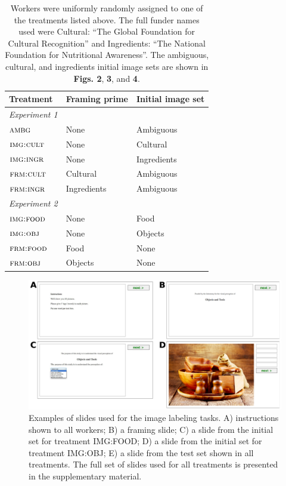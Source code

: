 \documentclass[12pt]{article}
\begin{document}
\begin{table}[t]
\centering
	\begin{tabular}{ l  l  l }
		\hline                       
		Treatment & Framing prime & Initial image set	\\ 
		\hline                       
		\textit{Experiment 1}\\
		$\textsc{ambg}$ & None & Ambiguous\\
		$\textsc{img:cult}$ & None & Cultural\\
		$\textsc{img:ingr}$ & None & Ingredients\\
		$\textsc{frm:cult}$ & Cultural & Ambiguous\\
		$\textsc{frm:ingr}$ & Ingredients & Ambiguous\\
		\hline  
		\textit{Experiment 2}\\
		$\textsc{img:food}$ & None & Food\\
		$\textsc{img:obj}$ & None & Objects\\
		$\textsc{frm:food}$ & Food & None\\
		$\textsc{frm:obj}$ & Objects & None\\
		\hline  
	\end{tabular}

	\caption{ \footnotesize{ 
		Workers were uniformly randomly assigned to one of the 
		treatments listed above. 
		The full funder names used were 
		Cultural: ``The Global Foundation for Cultural Recognition'' and 
		Ingredients: ``The National Foundation for Nutritional Awareness''.  
		The ambiguous, cultural, and ingredients initial image sets are shown 
		in \textbf{Figs. 2}, \textbf{3}, and \textbf{4}.
	}}
	\label{table:1}
\end{table}

\begin{figure}
	\centering
	\includegraphics[scale=0.7]{figs/tasks.pdf}
	\caption{Examples of slides used for the image labeling tasks. A) instructions shown to all workers; B) a framing slide; C) a slide from the initial set for treatment IMG:FOOD; D) a slide from the initial set for treatment IMG:OBJ; E) a slide from the test set shown in all treatments. The full set of slides used for all treatments is presented in the supplementary material.}
	\label{fig:task}
\end{figure}
\end{document}

